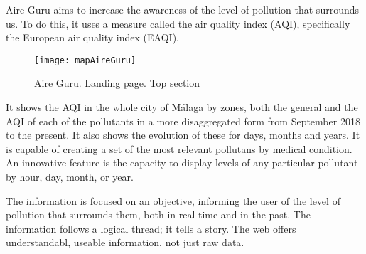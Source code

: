 Aire Guru aims to increase the awareness of the level of pollution that surrounds us. To do this, it uses a measure called
the air quality index (AQI), specifically the European air quality index (EAQI).

\begin{figure}[ht]
    \centering
    \texttt{[image: mapAireGuru]}
    \caption{Aire Guru. Landing page. Top section}
\end{figure}

It shows the AQI in the whole city of Málaga by zones, both the general and the AQI of each of the 
pollutants in a more disaggregated form from September 2018 to the present. It also shows the evolution
of these for days, months and years.
It is capable of creating a set of the most relevant pollutans by medical condition. An innovative feature is the capacity to display levels of any particular pollutant by hour, day, month, or year. 


\begin{itemize}
    \done The information is focused on an objective, informing the user of the level of pollution that surrounds them, both  in real time
    and in the past.
    \done The information follows a logical thread; it tells a story.
    \done The web offers understandabl, useable information, not just raw data.
\end{itemize}